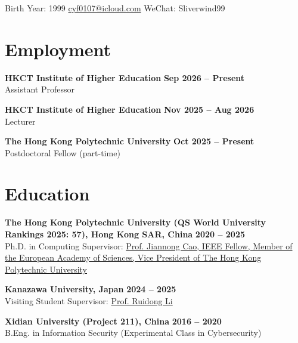 \documentclass{resume}
\begin{document}
\begin{center}
    \contact
        {Birth Year: 1999}
        {\href{mailto://cyf0107@icloud.com}{cyf0107@icloud.com}}
        {WeChat: Sliverwind99}
\end{center}

\section{Employment}
\begin{content}
    {\bf HKCT Institute of Higher Education} \hfill {\bf Sep 2026 -- Present} \\
    {Assistant Professor} \hfill

    {\bf HKCT Institute of Higher Education} \hfill {\bf Nov 2025 -- Aug 2026} \\
    {Lecturer} \hfill

    {\bf The Hong Kong Polytechnic University} \hfill {\bf Oct 2025 -- Present} \\
    {Postdoctoral Fellow (part-time)} \hfill
\sectionlineskip
\end{content}
\section{Education} 
\begin{content}
    {\bf The Hong Kong Polytechnic University (QS World University Rankings 2025: 57), Hong Kong SAR, China} \hfill {\bf 2020 -- 2025} \\ 
    {Ph.D. in Computing} \hfill 
    {Supervisor: \href{https://www4.comp.polyu.edu.hk/~csjcao/}{Prof. Jiannong Cao, IEEE Fellow, Member of the European Academy of Sciences, Vice President of The Hong Kong Polytechnic University}}
    
    {\bf Kanazawa University, Japan} \hfill {\bf 2024 -- 2025} \\ 
    {Visiting Student} \hfill 
    {Supervisor: \href{https://sites.google.com/site/liruidong/}{Prof. Ruidong Li}}
    
    {\bf Xidian University (Project 211), China} \hfill {\bf 2016 -- 2020} \\ 
    {B.Eng. in Information Security (Experimental Class in Cybersecurity)} \hfill 
\sectionlineskip
\end{content}

\end{document}
